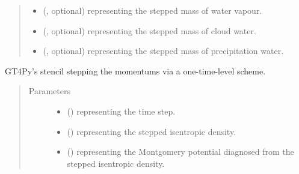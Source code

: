 \documentclass[letterpaper,10pt,english]{sphinxmanual}
\begin{document}
\begin{fulllineitems}
\begin{fulllineitems}
\begin{quote}
\begin{description}
\begin{itemize}
\item {} 
 (, optional) \textendash{}  representing the stepped mass of water vapour.

\item {} 
 (, optional) \textendash{}  representing the stepped mass of cloud water.

\item {} 
 (, optional) \textendash{}  representing the stepped mass of precipitation water.

\end{itemize}


\end{description}\end{quote}

\end{fulllineitems}


\begin{fulllineitems}
\label{\detokenize{api:dycore.prognostic_isentropic_forward_euler.PrognosticIsentropicForwardEuler._stencil_stepping_by_neglecting_vertical_advection_second_defs}}
GT4Py’s stencil stepping the momentums via a one-time-level scheme.
\begin{quote}\begin{description}
\item[{Parameters}] \leavevmode\begin{itemize}
\item {} 
 () \textendash{}  representing the time step.

\item {} 
 () \textendash{}  representing the stepped isentropic density.

\item {} 
 () \textendash{}  representing the Montgomery potential diagnosed from the stepped isentropic density.


\end{itemize}
\end{description}
\end{quote}
\end{fulllineitems}
\end{fulllineitems}
\end{document}
